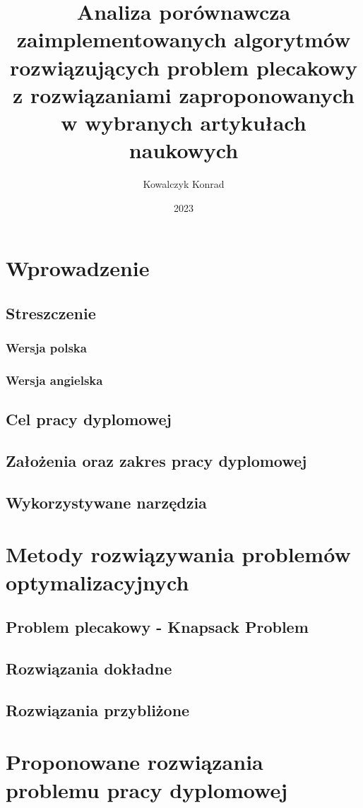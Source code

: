 \documentclass[mgr, pl, oneside, openright, final, openbib]{mgr}
\author{Kowalczyk Konrad}
\title{Analiza porównawcza zaimplementowanych algorytmów rozwiązujących problem plecakowy z rozwiązaniami zaproponowanych w wybranych artykułach naukowych}
\date{2023}
\begin{document}
\maketitle
{}
\tableofcontents

\chapter{Wprowadzenie}
\section{Streszczenie}
\subsection{Wersja polska}
\subsection{Wersja angielska}
\section{Cel pracy dyplomowej}
\section{Założenia oraz zakres pracy dyplomowej}
\section{Wykorzystywane narzędzia}

\newpage
\chapter{Metody rozwiązywania problemów optymalizacyjnych}
\section{Problem plecakowy - Knapsack Problem}
\section{Rozwiązania dokładne}
\section{Rozwiązania przybliżone}
\newpage
\chapter{Proponowane rozwiązania problemu pracy dyplomowej}
\newpage
\end{document}

